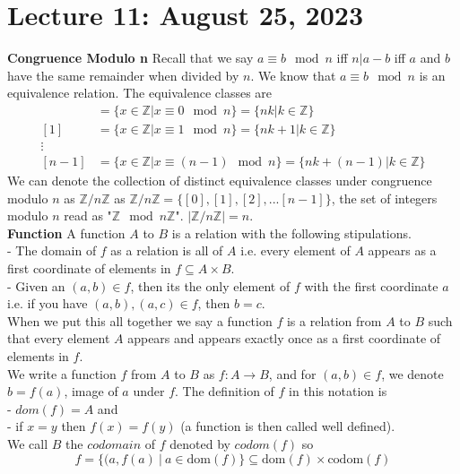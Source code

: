 \documentclass{article}
\begin{document}
\section{Lecture 11: August 25, 2023}
\textbf{Congruence Modulo n} Recall that we say \(a \equiv b \mod n\) iff \(n \vert a - b\) iff \(a\) and \(b\) have the same remainder when divided by \(n\). We know that \(a \equiv b \mod n\) is an equivalence relation. The equivalence classes are 
\begin{align*}
    [0] &= \{x \in \mathbb{Z} \vert x \equiv 0 \mod n\} = \{nk \vert k \in \mathbb{Z}\}\\
    [1] &= \{x \in \mathbb{Z} \vert x \equiv 1 \mod n\} = \{nk + 1 \vert k \in \mathbb{Z}\}\\
    \vdots\\
    [n-1] &= \{x \in \mathbb{Z} \vert x \equiv (n-1) \mod n\} = \{nk + (n-1) \vert k \in \mathbb{Z}\}
\end{align*}
We can denote the collection of distinct equivalence classes under congruence modulo \(n\) as \(\mathbb{Z}/n\mathbb{Z}\) as \(\mathbb{Z}/n\mathbb{Z} = \{[0],[1],[2],...[n-1]\}\), the set of integers modulo \(n\) read as "\(\mathbb{Z} \mod n \mathbb{Z}\)". \(|\mathbb{Z}/n\mathbb{Z}| = n\).\\
\textbf{Function} A function \(A\) to \(B\) is a relation with the following stipulations.\\
- The domain of \(f\) as a relation is all of \(A\) i.e. every element of \(A\) appears as a first coordinate of elements in \(f \subseteq A \times B\).\\
- Given an \((a,b) \in f\), then its the only element of \(f\) with the first coordinate \(a\) i.e. if you have \((a,b),(a,c) \in f\), then \(b = c\).\\
When we put this all together we say a function \(f\) is a relation from \(A\) to \(B\) such that every element \(A\) appears and appears exactly once as a first coordinate of elements in \(f\). \\
We write a function \(f\) from \(A\) to \(B\) as \(f: A \to B\), and for \((a,b) \in f\), we denote \(b = f(a)\), image of \(a\) under \(f\). The definition of \(f\) in this notation is\\
- \(dom(f) = A\) and \\
- if \(x = y\) then \(f(x) = f(y)\) (a function is then called well defined).\\
We call \(B\) the \(codomain\) of \(f\) denoted by \(codom(f)\) so
\[f = \{(a,f(a)\ \vert\ a \in \mathrm{dom}(f)\} \subseteq \mathrm{dom}(f) \times \mathrm{codom}(f)\]
\end{document}

